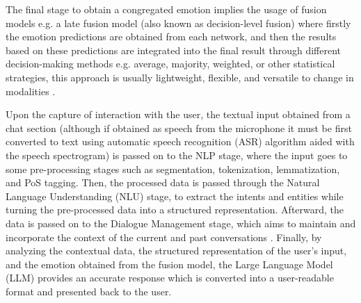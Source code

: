 \documentclass[runningheads]{llncs}
\begin{document}
The final stage to obtain a congregated emotion implies the usage of fusion models e.g. a late fusion model (also known as decision-level fusion) where firstly the emotion predictions are obtained from each network, and then the results based on these predictions are integrated into the final result through different decision-making methods e.g. average, majority, weighted, or other statistical strategies, this approach is usually lightweight, flexible, and versatile to change in modalities \cite{zhu_multimodal_2023}.

Upon the capture of interaction with the user, the textual input obtained from a chat section (although if obtained as speech from the microphone it must be first converted to text using automatic speech recognition (ASR) algorithm aided with the speech spectrogram) is passed on to the NLP stage, where the input goes to some pre-processing stages such as segmentation, tokenization, lemmatization, and PoS tagging. Then, the processed data is passed through the Natural Language Understanding (NLU) stage, to extract the intents and entities while turning the pre-processed data into a structured representation. Afterward, the data is passed on to the Dialogue Management stage, which aims to maintain and incorporate the context of the current and past conversations \cite{rizou_multilingual_2022}. Finally, by analyzing the contextual data, the structured representation of the user's input, and the emotion obtained from the fusion model, the Large Language Model (LLM) provides an accurate response which is converted into a user-readable format and presented back to the user.



\end{document}
